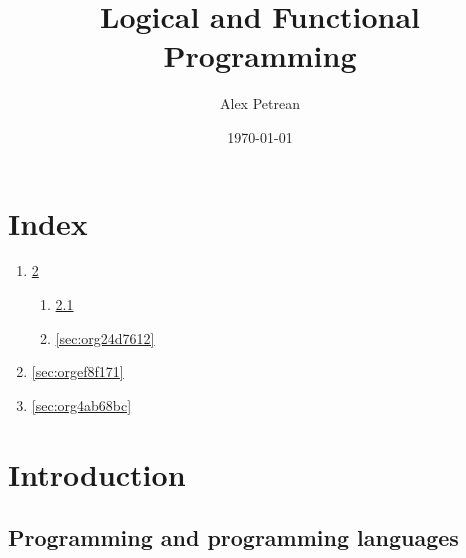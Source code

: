 \documentclass[11pt]{article}
\author{Alex Petrean}
\date{\today}
\title{Logical and Functional Programming}
\begin{document}
\maketitle
\tableofcontents


\section{Index}
\label{sec:orgbee9f7e}
\begin{enumerate}
\item \ref{sec:orgafb9890}
\begin{enumerate}
\item \ref{sec:orgbfaed7b}
\item \ref{sec:org24d7612}
\end{enumerate}
\item \ref{sec:orgef8f171}
\item \ref{sec:org4ab68bc}
\end{enumerate}

\section{Introduction}
\label{sec:orgafb9890}
\subsection{Programming and programming languages}
\label{sec:orgbfaed7b}
\end{document}
